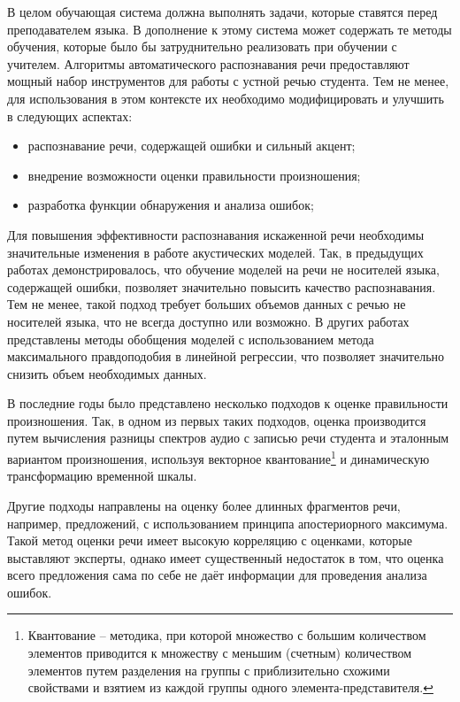 В целом обучающая система должна выполнять задачи, которые ставятся перед преподавателем языка. В дополнение к этому система может содержать те методы обучения, которые было бы затруднительно реализовать при обучении с учителем. Алгоритмы автоматического распознавания речи предоставляют мощный набор инструментов для работы с устной речью студента. Тем не менее, для использования в этом контексте их необходимо модифицировать и улучшить в следующих аспектах:
\begin{itemize}
	\item распознавание речи, содержащей ошибки и сильный акцент;
	\item внедрение возможности оценки правильности произношения;
	\item разработка функции обнаружения и анализа ошибок;
\end{itemize}

Для повышения эффективности распознавания искаженной речи необходимы значительные изменения в работе акустических моделей. Так, в предыдущих работах демонстрировалось\cite{ehsani1997subarashii}, что обучение моделей на речи не носителей языка, содержащей ошибки, позволяет значительно повысить качество распознавания. Тем не менее, такой подход требует больших объемов данных с речью не носителей языка, что не всегда доступно или возможно. В других работах\cite{thelen1997speaker} представлены методы обобщения моделей с использованием метода максимального правдоподобия в линейной регрессии, что позволяет значительно снизить объем необходимых данных.

В последние годы было представлено несколько подходов к оценке правильности произношения. Так, в одном из первых таких подходов\cite{hamada1993automatic}, оценка производится путем вычисления разницы спектров аудио с записью речи студента и эталонным вариантом произношения, используя векторное квантование\footnote{Квантование -- методика, при которой множество с большим количеством элементов приводится к множеству с меньшим (счетным) количеством элементов путем разделения на группы с приблизительно схожими свойствами и взятием из каждой группы одного элемента-представителя.} и динамическую трансформацию временной шкалы.

Другие подходы\cite{neumeyer1996automatic,franco1997automatic} направлены на оценку более длинных фрагментов речи, например, предложений, с использованием принципа апостериорного максимума\cite{wiki:Maximum_a_posteriori_estimation}. Такой метод оценки речи имеет высокую корреляцию с оценками, которые выставляют эксперты, однако имеет существенный недостаток в том, что оценка всего предложения сама по себе не даёт информации для проведения анализа ошибок.

